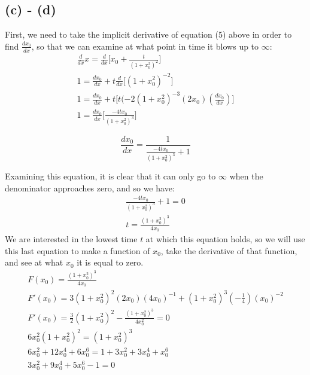 \documentclass{article}
\begin{document}
\subsection*{(c) - (d)}
First, we need to take the implicit derivative of equation (5) above in order to find $\frac{dx_0}{dx}$, so that we can examine at what point in time it blows up to $\infty$:
\begin{equation}
\begin{aligned}
\frac{d}{dx}x = \frac{d}{dx} \Big[x_0 + \frac{t}{(1+x_0^2)^2}\Big]\\
1 = \frac{dx_0}{dx} + t\frac{d}{dx}\Big[(1+x_0^2)^{-2}\Big]\\
1 = \frac{dx_0}{dx} + t\Big[t(-2(1 + x_0^2)^{-3}(2x_0)(\frac{dx_0}{dx})\Big]\\
1 = \frac{dx_0}{dx}\Big[\frac{-4tx_0}{(1+x_0^2)^3}\Big]
\end{aligned}
\end{equation}
\begin{tcolorbox}[minipage,colback=white,arc=0pt,outer arc=0pt]
\begin{equation}
\frac{dx_0}{dx} = \frac{1}{\frac{-4tx_0}{(1+x_0^2)^3} + 1}
\end{equation}
\end{tcolorbox}
Examining this equation, it is clear that it can only go to $\infty$ when the denominator approaches zero, and so we have:
\begin{equation}
\begin{aligned}
\frac{-4tx_0}{(1+x_0^2)^3} + 1 = 0\\
t = \frac{(1+x_0^2)^3}{4x_0}
\end{aligned}
\end{equation}
We are interested in the lowest time $t$ at which this equation holds, so we will use this last equation to make a function of $x_0$, take the derivative of that function, and see at what $x_0$ it is equal to zero.
\begin{equation}
\begin{aligned}
F(x_0) = \frac{(1+x_0^2)^3}{4x_0}\\
F'(x_0) = 3(1+x_0^2)^2(2x_0)(4x_0)^{-1} + (1+x_0^2)^3(-\frac{1}{4})(x_0)^{-2}\\
F'(x_0) = \frac{3}{2}(1+x_0^2)^2 - \frac{(1+x_0^2)^3}{4x_0^2} = 0\\
6x_0^2(1+x_0^2)^2 = (1+x_0^2)^3\\
6x_0^2 + 12x_0^4 +6x_0^6 = 1 + 3x_0^2 + 3x_0^4 +x_0^6\\
3x_0^2 + 9x_0^4 + 5x_0^6 -1 = 0
\end{aligned}
\end{equation}
\end{document}

